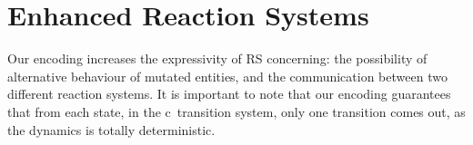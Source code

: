 
\section{Enhanced  Reaction Systems}
\label{sec:discussion}

Our encoding increases the expressivity of  RS  concerning:
the possibility of alternative behaviour of
mutated entities, and  the communication between two different reaction systems.
It is important to note that our encoding guarantees that from each state, 
in the  c\CNA \ transition system, only one transition comes out, 
as the dynamics is totally deterministic.



